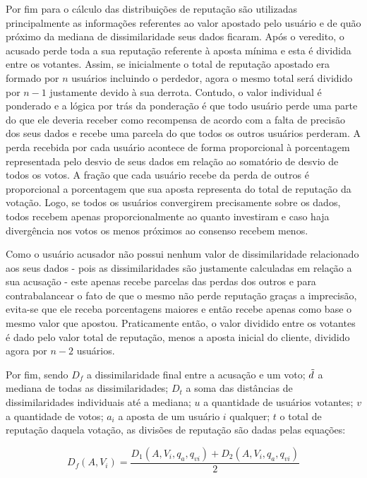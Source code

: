 Por fim para o cálculo das distribuições de reputação são utilizadas principalmente as informações referentes ao valor apostado pelo usuário e de quão próximo da mediana de dissimilaridade seus dados ficaram. Após o veredito, o acusado perde toda a sua reputação referente à aposta mínima e esta é dividida entre os votantes. Assim, se inicialmente o total de reputação apostado era formado por $n$ usuários incluindo o perdedor, agora o mesmo total será dividido por $n - 1$ justamente devido à sua derrota. Contudo, o valor individual é ponderado e a lógica por trás da ponderação é que todo usuário perde uma parte do que ele deveria receber como recompensa de acordo com a falta de precisão dos seus dados e recebe uma parcela do que todos os outros usuários perderam. A perda recebida por cada usuário acontece de forma proporcional à porcentagem representada pelo desvio de seus dados em relação ao somatório de desvio de todos os votos. A fração que cada usuário recebe da perda de outros é proporcional a porcentagem que sua aposta representa do total de reputação da votação. Logo, se todos os usuários convergirem precisamente sobre os dados, todos recebem apenas proporcionalmente ao quanto investiram e caso haja divergência nos votos os menos próximos ao consenso recebem menos. 

%
Como o usuário acusador não possui nenhum valor de dissimilaridade relacionado aos seus dados - pois as dissimilaridades são justamente calculadas em relação a sua acusação - este apenas recebe parcelas das perdas dos outros e para contrabalancear o fato de que o mesmo não perde reputação graças a imprecisão, evita-se que ele receba porcentagens maiores e então recebe apenas como base o mesmo valor que apostou. Praticamente então, o valor dividido entre os votantes é dado pelo valor total de reputação, menos a aposta inicial do cliente, dividido agora por $n - 2$ usuários. 

Por fim, sendo $D_f$ a dissimilaridade final entre a acusação e um voto; $\Tilde{d}$ a mediana de todas as dissimilaridades; $D_t$ a soma das distâncias de dissimilaridades individuais até a mediana; $u$ a quantidade de usuários votantes; $v$ a quantidade de votos; $a_i$ a aposta de um usuário $i$ qualquer; $t$ o total de reputação daquela votação, as divisões de reputação são dadas pelas equações: 

\begin{equation}
    D_f(A, V_i) = \frac{D_1(A, V_i, q_a, q_{vi}) + D_2(A, V_i, q_a, q_{vi})}{2}
\end{equation}

